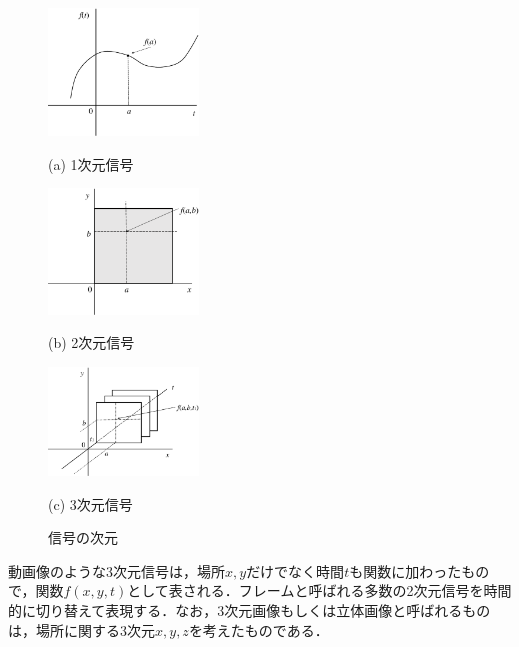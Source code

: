 \begin{figure}[H]
\begin{center}
\begin{minipage}{4cm}
\begin{center}
\includegraphics[width=4cm]{fig/zu-7-2-a.eps}

(a) 1次元信号
\end{center}
\end{minipage}
\begin{minipage}{4cm}
\begin{center}
\includegraphics[width=4cm]{fig/zu-7-2-b.eps}

(b) 2次元信号
\end{center}
\end{minipage}

\begin{minipage}{4cm}
\begin{center}
\includegraphics[width=4cm]{fig/zu-7-2-c.eps}

(c) 3次元信号
\end{center}
\end{minipage}
\end{center}
\caption{信号の次元}
\label{fig:zu-07-2}
\end{figure}

動画像のような3次元信号は，場所$x,y$だけでなく時間$t$も関数に加わったもので，関数$f(x,y,t)$として表される．フレームと呼ばれる多数の2次元信号を時間的に切り替えて表現する．なお，3次元画像もしくは立体画像と呼ばれるものは，場所に関する3次元$x,y,z$を考えたものである．


